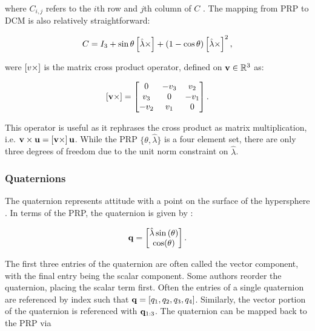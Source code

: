 where $C_{i,j}$ refers to the $i$th row and $j$th column of $C$ \cite{shuster1993}. The mapping from PRP to DCM is also relatively straightforward:

\begin{equation} \labelAndRemember{eq:prp2dcm}
    {C = I_3 + \sin\theta\matcp{\hat{\lambda}} + (1-\cos\theta)\matcp{\hat{\lambda}}^2,}
\end{equation}

were $\left[v \times\right]$ is the matrix cross product operator, defined on $\mathbf{v} \in \mathbb{R}^3$ as:

\begin{equation}
    \left[\mathbf{v} \times\right] = \begin{bmatrix}
        0 & -v_3 & v_2 \\
        v_3 & 0 & -v_1 \\
        -v_2 & v_1 & 0
    \end{bmatrix}.
\end{equation}

This operator is useful as it rephrases the cross product as matrix multiplication, i.e. $\mathbf{v} \times \mathbf{u} = \left[\mathbf{v} \times\right]\mathbf{u}$. While the PRP $\{\theta, \hat{\lambda}\}$ is a four element set, there are only three degrees of freedom due to the unit norm constraint on $\hat{\lambda}$. 

\subsubsection{Quaternions}

The quaternion represents attitude with a point on the surface of the hypersphere \sthree. In terms of the PRP, the quaternion is given by \cite{crassidis1ed}:

\begin{equation} \labelAndRemember{eq:prp2quat}
    {
    \vctr{q} = \begin{bmatrix} \hat{\lambda} \sin\left( \theta \right) \\ \cos(\theta) \end{bmatrix}.
    }
\end{equation}

The first three entries of the quaternion are often called the vector component, with the final entry being the scalar component. Some authors reorder the quaternion, placing the scalar term first. Often the entries of a single quaternion are referenced by index such that $\mathbf{q} = \left[ q_1, q_2, q_3, q_4 \right]$. Similarly, the vector portion of the quaternion is referenced with $\mathbf{q}_{1:3}$. The quaternion can be mapped back to the PRP \cite{crassidis1ed} via

